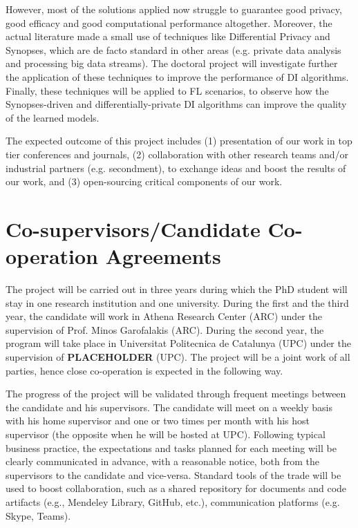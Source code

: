 \documentclass[12pt]{article}
\begin{document}
However, most of the solutions applied now struggle to guarantee good privacy, good efficacy and good computational performance 
altogether. 
Moreover, the actual literature made a small use of techniques like Differential Privacy and Synopses, which are de facto standard in 
other areas (e.g. private data analysis and processing big data streams). The doctoral project will investigate further the application of 
these techniques to improve the performance of DI algorithms. Finally, these techniques will be applied to FL scenarios, to observe 
how the Synopses-driven and differentially-private DI algorithms can improve the quality of the learned models.



The expected outcome of this project includes (1) presentation of our work in top tier conferences
and journals, (2) collaboration with other research teams and/or industrial partners (e.g. secondment), to
exchange ideas and boost the results of our work, and (3) open-sourcing critical components of our work.

\section{Co-supervisors/Candidate Co-operation Agreements}
The project will be carried out in three years during which the PhD student will stay in one research institution and one university. 
During the first and the third year, the candidate will work in Athena Research Center (ARC) under the supervision of Prof. 
Minos Garofalakis (ARC). During the second year, the program will take place in Universitat Politecnica de Catalunya (UPC) under 
the supervision of \textbf{PLACEHOLDER} (UPC). The project will be a joint work of all parties, hence close co-operation is 
expected in the following way.

The progress of the project will be validated through frequent meetings between the candidate and his supervisors. The candidate will meet on a weekly basis with his home supervisor and one or two times per month with his host supervisor (the opposite when he will be hosted at UPC). Following typical business practice, the expectations and tasks planned for each meeting will be clearly communicated in advance, with a reasonable notice, both from the supervisors to the candidate and vice-versa. Standard tools of the trade will be used to boost collaboration, such
as a shared repository for documents and code artifacts (e.g., Mendeley Library, GitHub, etc.), communication platforms (e.g. Skype, Teams).
\end{document}
